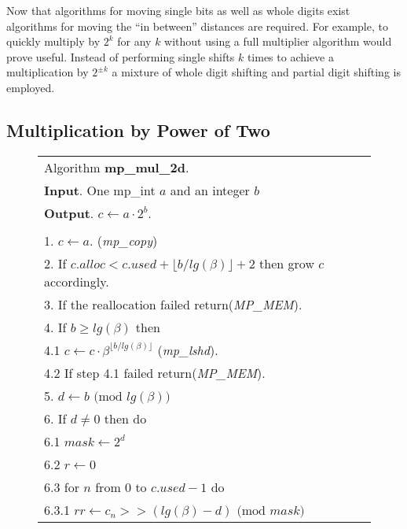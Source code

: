 \documentclass[b5paper]{book}
\begin{document}
Now that algorithms for moving single bits as well as whole digits exist algorithms for moving the ``in between'' distances are required.  For 
example, to quickly multiply by $2^k$ for any $k$ without using a full multiplier algorithm would prove useful.  Instead of performing single
shifts $k$ times to achieve a multiplication by $2^{\pm k}$ a mixture of whole digit shifting and partial digit shifting is employed.  

\subsection{Multiplication by Power of Two}

\newpage\begin{figure}[!here]
\begin{small}
\begin{center}
\begin{tabular}{l}
\hline Algorithm \textbf{mp\_mul\_2d}. \\
\textbf{Input}.   One mp\_int $a$ and an integer $b$ \\
\textbf{Output}.  $c \leftarrow a \cdot 2^b$. \\
\hline \\
1.  $c \leftarrow a$.  (\textit{mp\_copy}) \\
2.  If $c.alloc < c.used + \lfloor b / lg(\beta) \rfloor + 2$ then grow $c$ accordingly. \\
3.  If the reallocation failed return(\textit{MP\_MEM}). \\
4.  If $b \ge lg(\beta)$ then \\
\hspace{3mm}4.1  $c \leftarrow c \cdot \beta^{\lfloor b / lg(\beta) \rfloor}$ (\textit{mp\_lshd}). \\
\hspace{3mm}4.2  If step 4.1 failed return(\textit{MP\_MEM}). \\
5.  $d \leftarrow b \mbox{ (mod }lg(\beta)\mbox{)}$ \\
6.  If $d \ne 0$ then do \\
\hspace{3mm}6.1  $mask \leftarrow 2^d$ \\
\hspace{3mm}6.2  $r \leftarrow 0$ \\
\hspace{3mm}6.3  for $n$ from $0$ to $c.used - 1$ do \\
\hspace{6mm}6.3.1  $rr \leftarrow c_n >> (lg(\beta) - d) \mbox{ (mod }mask\mbox{)}$ \\

\end{tabular}
\end{center}
\end{small}
\end{figure}
\end{document}
